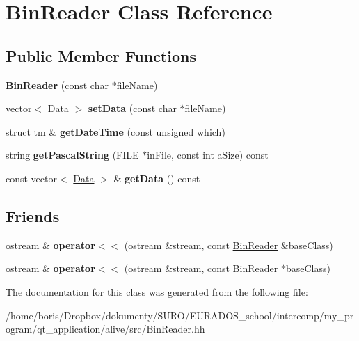 \hypertarget{classBinReader}{\section{Bin\-Reader Class Reference}
\label{classBinReader}
}
\subsection*{Public Member Functions}
\begin{DoxyCompactItemize}
\item 
\hypertarget{classBinReader_a6c7680b4ce310905156b5d65c92424ca}{{\bfseries Bin\-Reader} (const char $\ast$file\-Name)}\label{classBinReader_a6c7680b4ce310905156b5d65c92424ca}

\item 
\hypertarget{classBinReader_abf3b86c5dc74758b8c84806c35940894}{vector$<$ \hyperlink{classData}{Data} $>$ {\bfseries set\-Data} (const char $\ast$file\-Name)}\label{classBinReader_abf3b86c5dc74758b8c84806c35940894}

\item 
\hypertarget{classBinReader_a096bf26e0207b60c3349595e2e1202d5}{struct tm \& {\bfseries get\-Date\-Time} (const unsigned which)}\label{classBinReader_a096bf26e0207b60c3349595e2e1202d5}

\item 
\hypertarget{classBinReader_a1d35f71ccc83f526468f2f17287f4c63}{string {\bfseries get\-Pascal\-String} (F\-I\-L\-E $\ast$in\-File, const int a\-Size) const }\label{classBinReader_a1d35f71ccc83f526468f2f17287f4c63}

\item 
\hypertarget{classBinReader_ad35002b6ac707df24aacef43d08fc806}{const vector$<$ \hyperlink{classData}{Data} $>$ \& {\bfseries get\-Data} () const }\label{classBinReader_ad35002b6ac707df24aacef43d08fc806}

\end{DoxyCompactItemize}
\subsection*{Friends}
\begin{DoxyCompactItemize}
\item 
\hypertarget{classBinReader_a8756654c7da6be012f9310e55edf6921}{ostream \& {\bfseries operator$<$$<$} (ostream \&stream, const \hyperlink{classBinReader}{Bin\-Reader} \&base\-Class)}\label{classBinReader_a8756654c7da6be012f9310e55edf6921}

\item 
\hypertarget{classBinReader_a4dab98a7873cf69be58db67c9fc92050}{ostream \& {\bfseries operator$<$$<$} (ostream \&stream, const \hyperlink{classBinReader}{Bin\-Reader} $\ast$base\-Class)}\label{classBinReader_a4dab98a7873cf69be58db67c9fc92050}

\end{DoxyCompactItemize}


The documentation for this class was generated from the following file\-:\begin{DoxyCompactItemize}
\item 
/home/boris/\-Dropbox/dokumenty/\-S\-U\-R\-O/\-E\-U\-R\-A\-D\-O\-S\-\_\-school/intercomp/my\-\_\-program/qt\-\_\-application/alive/src/Bin\-Reader.\-hh\end{DoxyCompactItemize}
